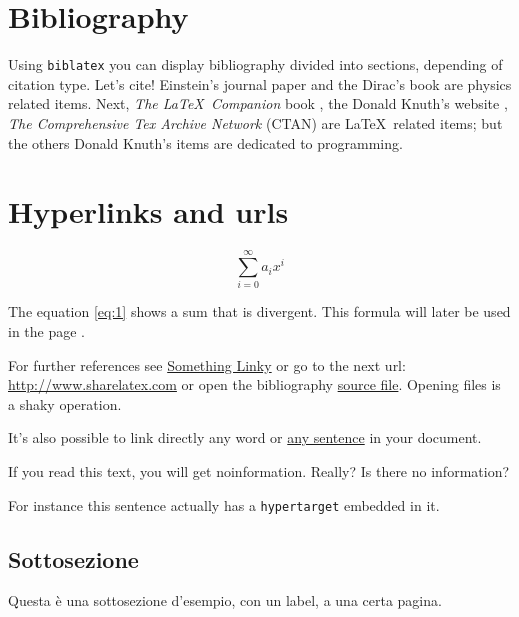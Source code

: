 
\section{Bibliography}

Using \texttt{biblatex} you can display bibliography divided into sections, 
depending of citation type. 
Let's cite! Einstein's journal paper \cite{einstein} and the Dirac's 
book \cite{dirac} are physics related items. 
Next, \textit{The \LaTeX\ Companion} book \cite{latexcompanion}, the Donald 
Knuth's website \cite{knuthwebsite}, \textit{The Comprehensive Tex Archive 
Network} (CTAN) \cite{ctan} are \LaTeX\ related items; but the others Donald 
Knuth's items \cite{knuth-fa,knuth-acp} are dedicated to programming. 

\section{Hyperlinks and urls}

\begin{equation}
\label{eq:1}
\sum_{i=0}^{\infty} a_i x^i
\end{equation}
 
The equation \ref{eq:1} shows a sum that is divergent. This formula 
will later be used in the page \pageref{sss:esempio}.
 
For further references see \href{http://www.sharelatex.com}{Something 
Linky} or go to the next url: \url{http://www.sharelatex.com} or open 
the bibliography \href{run:./chapters/bibliography-guide.tex}{source file}.
Opening files is a shaky operation.
 
It's also possible to link directly any word or 
\hyperlink{ht:thesentence}{any sentence} in your document.

If you read this text, you will get noinformation.  Really?  Is there no information?

For instance \hypertarget{ht:thesentence}{this sentence} actually has a \texttt{hypertarget} embedded in it.
 
\subsection{Sottosezione}
\label{sss:esempio}

Questa è una sottosezione d'esempio, con un label, a una certa pagina.
